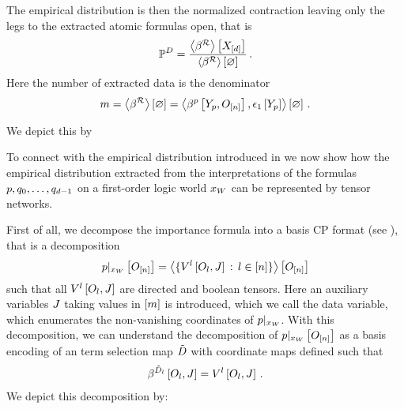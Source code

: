 The empirical distribution is then the normalized contraction leaving only the legs to the extracted atomic formulas open, that is
\begin{align*}
    \mathbb{P}^{D}
    = \frac{
        \left\langle \beta^{\mathcal{R}}\right\rangle \left[ X_{[d]} \right]
    }{
        \left\langle \beta^{\mathcal{R}}\right\rangle \left[ \varnothing \right]
    }  \, .
\end{align*}
Here the number of extracted data is the denominator
\begin{align*}
    m
    = \left\langle \beta^{\mathcal{R}}\right\rangle \left[ \varnothing \right]
    = \left\langle \beta^{p}\left[Y_{p},O_{[n]}\right],\epsilon_1\left[Y_{p}\right]\right\rangle \left[ \varnothing \right]\, .
\end{align*}

We depict this by
\begin{center}
    
\end{center}





To connect with the empirical distribution introduced in  we now show how the empirical distribution extracted from the interpretations of the formulas $p,q_{0},\ldots,q_{d-1}$ on a first-order logic world $x_{W}$ can be represented by tensor networks.

First of all, we decompose the importance formula into a basis CP format (see ), that is a decomposition
\begin{align*}
    {p}|_{x_{W}} \left[O_{[n]}\right]
    = \left\langle 
        \{V^{l}\left[O_{l},J\right] \, : \, l\in[n] \}
    \right\rangle \left[ O_{[n]} \right]
\end{align*}
such that all $V^{l}\left[O_{l},J\right]$ are directed and boolean tensors.
Here an auxiliary variables $J$ taking values in $[m]$ is introduced, which we call the data variable, which enumerates the non-vanishing coordinates of ${p}|_{x_{W}}$.
With this decomposition, we can understand the decomposition of ${p}|_{x_{W}} \left[O_{[n]}\right]$ as a basis encoding of an term selection map $\tilde{D}$ with coordinate maps defined such that
\begin{align*}
    \beta^{\tilde{D}_{l}}\left[O_{l},J\right]
    = V^{l}\left[O_{l},J\right] \, .
\end{align*}
We depict this decomposition by:
\begin{center}
    
\end{center}


